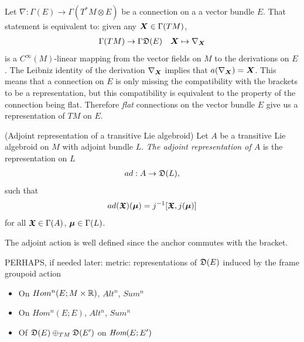 \begin{example}
Let $\nabla: \Gamma(E) \to \Gamma(T^*M \otimes E)$ be a connection on a a vector bundle $E$. That statement is equivalent to: given any $\bm{X} \in \Gamma(TM)$,
\begin{align*}
    \Gamma(TM) \to \Gamma\mathfrak{D}(E) &&
    \bm{X} \mapsto \nabla_{\bm{X}}
\end{align*}
is a $C^\infty(M)$-linear mapping from the vector fields on $M$ to the derivations on $E$. The Leibniz identity of the derivation $\nabla_{\bm{X}}$ implies that $a(\nabla_{\bm{X}}) = \bm{X}$. This means that a connection on $E$ is only missing the compatibility with the brackets to be a representation, but this compatibility is equivalent to the property of the connection being flat. Therefore \emph{flat} connections on the vector bundle $E$ give us a representation of $TM$ on $E$.
\end{example}

\begin{definition}(Adjoint representation of a transitive Lie algebroid)\label{defnAdjointAct}
Let $A$ be a transitive Lie algebroid on $M$ with adjoint bundle $L$. \emph{The adjoint representation of $A$} is the representation on $L$
\begin{align*}
    ad: A \to \mathfrak{D}(L), 
\end{align*}
such that
\begin{align*}
     ad(\bm{\mathfrak{X}})(\bm{\mu}) = j^{-1}[\bm{\mathfrak{X}}, j(\bm{\mu})]
\end{align*}
for all $\bm{\mathfrak{X}} \in \Gamma(A)$, $\bm{\mu} \in \Gamma(L)$.
\end{definition}
The adjoint action is well defined since the anchor commutes with the bracket.

PERHAPS, if needed later: metric: representations of $\mathfrak{D}(E)$ induced by the frame groupoid action
    \begin{itemize}
    
    \item On $Hom^n(E; M \times \mathbb{R})$, $Alt^n$, $Sum^n$
    
    \item On $Hom^n(E; E)$, $Alt^n$, $Sum^n$
    
    \item Of $\mathfrak{D}(E)\oplus_{TM} \mathfrak{D}(E')$ on $\operatorname{\textit{Hom}}(E; E')$
    
    \end{itemize}


